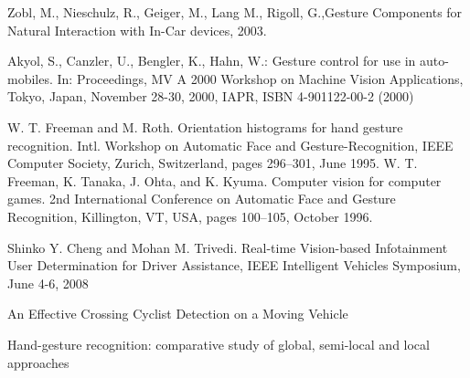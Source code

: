 \documentclass[a4paper,11pt,oneside]{book}
\begin{document}
\begin{thebibliography}{2}

 Zobl, M., Nieschulz, R., Geiger, M., Lang M., Rigoll, G.,{Gesture Components for Natural Interaction with In-Car devices}, 2003.

 Akyol, S., Canzler, U., Bengler, K., Hahn, W.: Gesture control for use in auto-mobiles. In: Proceedings, MV A 2000 Workshop on Machine Vision Applications, Tokyo, Japan, November 28-30, 2000, IAPR, ISBN 4-901122-00-2 (2000)

 W. T. Freeman and M. Roth. Orientation histograms for hand gesture recognition. Intl. Workshop on Automatic Face and Gesture-Recognition, IEEE Computer Society, Zurich, Switzerland, pages 296–301, June 1995.
 W. T. Freeman, K. Tanaka, J. Ohta, and K. Kyuma. Computer vision for computer games. 2nd International Conference on Automatic Face and Gesture Recognition, Killington, VT, USA, pages 100–105, October 1996.

 Shinko Y. Cheng and Mohan M. Trivedi. Real-time Vision-based Infotainment User Determination for Driver Assistance, IEEE Intelligent Vehicles Symposium, June 4-6, 2008

 An Effective Crossing Cyclist Detection on a Moving Vehicle

 Hand-gesture recognition: comparative study of global, semi-local and local approaches


\end{thebibliography}
\end{document}
